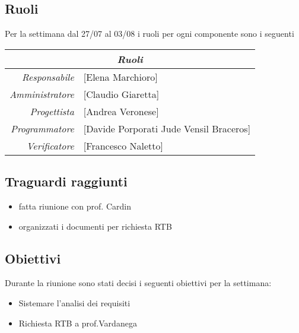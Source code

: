 \documentclass[12pt]{article}
\begin{document}
\subsection{Ruoli}
Per la settimana dal 27/07 al 03/08 i ruoli per ogni componente sono i seguenti
\\
\begin{tabular}{r | l}
    \multicolumn{2}{c}{\textit{Ruoli}}\\
    \hline
    \textit{Responsabile} &
    [Elena Marchioro]\makecell{}\\
    \textit{Amministratore} &
    [Claudio Giaretta]\makecell{}\\
    \textit{Progettista} &
    [Andrea Veronese]\makecell{}\\
    \textit{Programmatore} &
    [Davide Porporati Jude Vensil Braceros]\makecell{}\\
    \textit{Verificatore} & 
    [Francesco Naletto]\makecell{}\\
\end{tabular}

\subsection{Traguardi raggiunti}
\begin{itemize}
    \item fatta riunione con prof. Cardin
    \item organizzati i documenti per richiesta RTB
\end{itemize}

\subsection{Obiettivi}
Durante la riunione sono stati decisi i seguenti obiettivi per la settimana:
\begin{itemize}
    \item Sistemare l’analisi dei requisiti
    \item Richiesta RTB a prof.Vardanega
    

\end{itemize}
\end{document}
